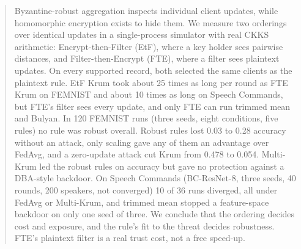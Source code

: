\begin{abstract}
Byzantine-robust aggregation inspects individual client updates, while homomorphic encryption exists to hide them. We measure two orderings over identical updates in a single-process simulator with real CKKS arithmetic: Encrypt-then-Filter (EtF), where a key holder sees pairwise distances, and Filter-then-Encrypt (FTE), where a filter sees plaintext updates. On every supported record, both selected the same clients as the plaintext rule. EtF Krum took about 25 times as long per round as FTE Krum on FEMNIST and about 10 times as long on Speech Commands, but FTE's filter sees every update, and only FTE can run trimmed mean and Bulyan. In 120 FEMNIST runs (three seeds, eight conditions, five rules) no rule was robust overall. Robust rules lost 0.03 to 0.28 accuracy without an attack, only scaling gave any of them an advantage over FedAvg, and a zero-update attack cut Krum from 0.478 to 0.054. Multi-Krum led the robust rules on accuracy but gave no protection against a DBA-style backdoor. On Speech Commands (BC-ResNet-8, three seeds, 40 rounds, 200 speakers, not converged) 10 of 36 runs diverged, all under FedAvg or Multi-Krum, and trimmed mean stopped a feature-space backdoor on only one seed of three. We conclude that the ordering decides cost and exposure, and the rule's fit to the threat decides robustness. FTE's plaintext filter is a real trust cost, not a free speed-up.
\end{abstract}
